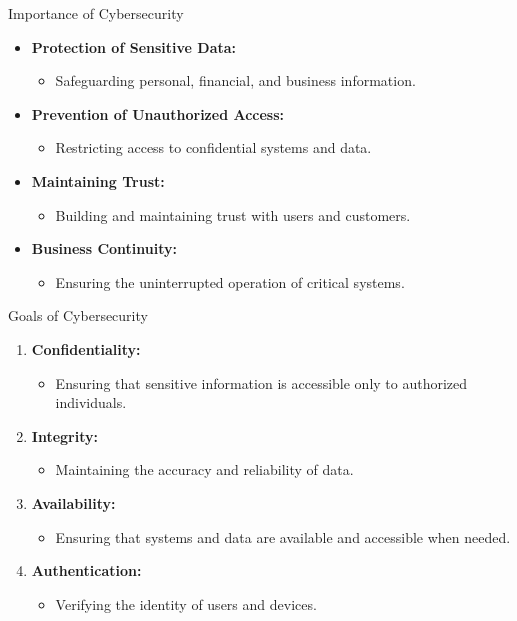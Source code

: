 \begin{frame}{Importance of Cybersecurity}
  \begin{itemize}
    \item \textbf{Protection of Sensitive Data:}
      \begin{itemize}
        \item Safeguarding personal, financial, and business information.
      \end{itemize}
    \item \textbf{Prevention of Unauthorized Access:}
      \begin{itemize}
        \item Restricting access to confidential systems and data.
      \end{itemize}
    \item \textbf{Maintaining Trust:}
      \begin{itemize}
        \item Building and maintaining trust with users and customers.
      \end{itemize}
    \item \textbf{Business Continuity:}
      \begin{itemize}
        \item Ensuring the uninterrupted operation of critical systems.
      \end{itemize}
  \end{itemize}
\end{frame}

\begin{frame}{Goals of Cybersecurity}
  \begin{enumerate}
    \item \textbf{Confidentiality:}
      \begin{itemize}
        \item Ensuring that sensitive information is accessible only to authorized individuals.
      \end{itemize}
    \item \textbf{Integrity:}
      \begin{itemize}
        \item Maintaining the accuracy and reliability of data.
      \end{itemize}
    \item \textbf{Availability:}
      \begin{itemize}
        \item Ensuring that systems and data are available and accessible when needed.
      \end{itemize}
    \item \textbf{Authentication:}
      \begin{itemize}
        \item Verifying the identity of users and devices.
      \end{itemize}
  \end{enumerate}
\end{frame}

